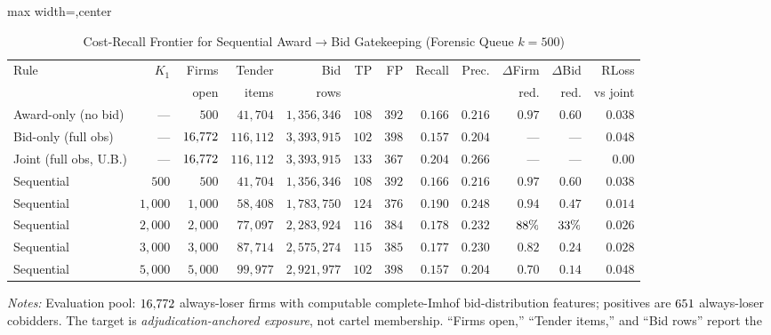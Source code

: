 \begin{table}[htbp]
\centering
\caption{Cost-Recall Frontier for Sequential Award$\rightarrow$Bid Gatekeeping (Forensic Queue $k=500$)}
\label{tab:cost_recall_frontier}
\begin{adjustbox}{max width=\textwidth,center}
\begin{threeparttable}
\scriptsize
\begin{tabular}{lrrrrrrrrrrr}
\toprule
Rule & $K_1$ & Firms & Tender & Bid & TP & FP & Recall & Prec. & $\Delta$Firm & $\Delta$Bid & RLoss \\
 & & open & items & rows & & & & & red. & red. & vs joint \\
\midrule
Award-only (no bid) & --- & $500$ & $41{,}704$ & $1{,}356{,}346$ & $108$ & $392$ & $0.166$ & $0.216$ & $0.97$ & $0.60$ & $0.038$ \\
Bid-only (full obs) & --- & $16{,}772$ & $116{,}112$ & $3{,}393{,}915$ & $102$ & $398$ & $0.157$ & $0.204$ & --- & --- & $0.048$ \\
Joint (full obs, U.B.) & --- & $16{,}772$ & $116{,}112$ & $3{,}393{,}915$ & $133$ & $367$ & $0.204$ & $0.266$ & --- & --- & $0.00$ \\
Sequential & $500$ & $500$ & $41{,}704$ & $1{,}356{,}346$ & $108$ & $392$ & $0.166$ & $0.216$ & $0.97$ & $0.60$ & $0.038$ \\
Sequential & $1{,}000$ & $1{,}000$ & $58{,}408$ & $1{,}783{,}750$ & $124$ & $376$ & $0.190$ & $0.248$ & $0.94$ & $0.47$ & $0.014$ \\
Sequential & $2{,}000$ & $2{,}000$ & $77{,}097$ & $2{,}283{,}924$ & $116$ & $384$ & $0.178$ & $0.232$ & $88\%$ & $33\%$ & $0.026$ \\
Sequential & $3{,}000$ & $3{,}000$ & $87{,}714$ & $2{,}575{,}274$ & $115$ & $385$ & $0.177$ & $0.230$ & $0.82$ & $0.24$ & $0.028$ \\
Sequential & $5{,}000$ & $5{,}000$ & $99{,}977$ & $2{,}921{,}977$ & $102$ & $398$ & $0.157$ & $0.204$ & $0.70$ & $0.14$ & $0.048$ \\
\bottomrule
\end{tabular}
\begin{tablenotes}
\scriptsize
\item \textit{Notes:} Evaluation pool: $16{,}772$ always-loser
firms with computable complete-Imhof bid-distribution features;
positives are $651$ always-loser cobidders. The target is
\emph{adjudication-anchored exposure}, not cartel membership.
``Firms open,'' ``Tender items,'' and ``Bid rows'' report the

\end{tablenotes}
\end{threeparttable}
\end{adjustbox}
\end{table}
